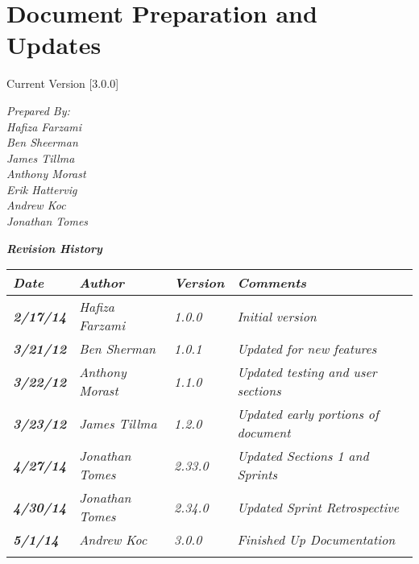 
\chapter{Document Preparation and Updates}

Current Version [3.0.0]
\vspace*{5mm}

{\color{MSBlue3}
\noindent
\textit{Prepared By:}\\
\textit{Hafiza Farzami}\\
\textit{Ben Sheerman}\\
\textit{James Tillma}\\
\textit{Anthony Morast}\\
\textit{Erik Hattervig}\\
\textit{Andrew Koc}\\
\textit{Jonathan Tomes}\\
}

\vfill
\noindent
{\color{color02} \textit{\textbf{Revision History}}}\\
\begin{tabular}{|>{\raggedright}p{1.5cm}|>{\raggedright}p{3cm}|>{\raggedright}p{1.5cm}|>{\raggedright}p{9cm}|}
\hline
\textit{\textbf{Date}} &  \textit{\textbf{Author}} & \textit{\textbf{Version}} & \textit{\textbf{Comments}}\tabularnewline
\hline
 \textit{\textbf{2/17/14}} & \textit{Hafiza Farzami} & \textit{1.0.0} & \textit{Initial version}\tabularnewline
\hline
\textit{\textbf{3/21/12}} & \textit{Ben Sherman} & \textit{1.0.1} & \textit{Updated for new features}\tabularnewline
\hline
\textit{\textbf{3/22/12}} & \textit{Anthony Morast} & \textit{1.1.0} & \textit{Updated testing and user sections}\tabularnewline
 \hline
\textit{\textbf{3/23/12}} & \textit{James Tillma} & \textit{1.2.0} & \textit{Updated early portions of document}\tabularnewline
\hline
\textit{\textbf{4/27/14}} & \textit{Jonathan Tomes}  &\textit{2.33.0}  & \textit{Updated Sections 1 and Sprints} \tabularnewline
\hline
\textit{\textbf{4/30/14}} & \textit{Jonathan Tomes}  &\textit{2.34.0}  & \textit{Updated Sprint Retrospective} \tabularnewline
\hline
\textit{\textbf{5/1/14}} & \textit{Andrew Koc}  &\textit{3.0.0}  & \textit{Finished Up Documentation} \tabularnewline
\hline
 &  &  & \tabularnewline
\hline
\end{tabular}
\vfill

